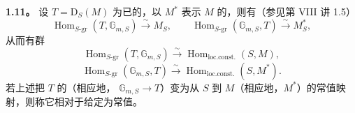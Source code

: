 \textbf{1.11。} 设 $T=\mathrm D_S(M)$ 为已的，以 $M^*$ 表示 $M$ 的，则有（参见第 VIII 讲 1.5）
\[\operatorname{Hom}_{S\text{-gr}}(T,\mathbb G_{m,S})\xrightarrow\sim M_S,\qquad\operatorname{Hom}_{S\text{-gr}}(\mathbb G_{m,S},T)\xrightarrow\sim M_S^*,\]
从而有群
\[\operatorname{Hom}_{S\text{-gr}}(T,\mathbb G_{m,S})\xrightarrow\sim\operatorname{Hom}_{\mathrm{loc.const.}}(S,M),\]
\[\operatorname{Hom}_{S\text{-gr}}(\mathbb G_{m,S},T)\xrightarrow\sim\operatorname{Hom}_{\mathrm{loc.const.}}(S,M^*).\]
若上述把 $T$ 的（相应地， $\mathbb G_{m,S}\to T$）变为从 $S$ 到 $M$（相应地，$M^*$）的常值映射，则称它相对于给定为常值。

